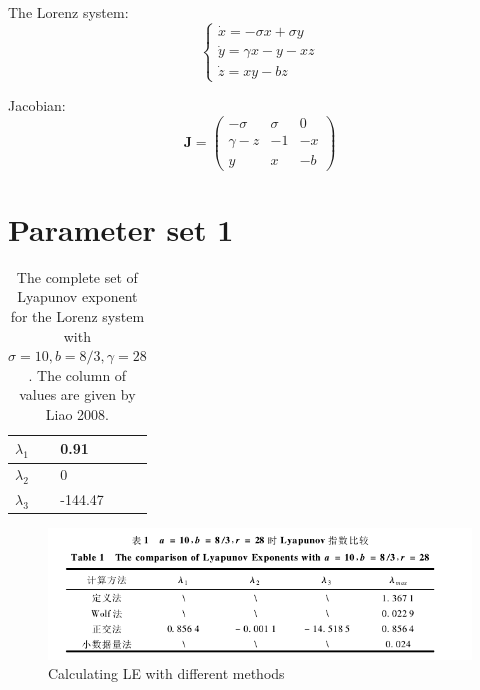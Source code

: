 \documentclass{article}
\begin{document}
	The Lorenz system:
	\begin{displaymath}
		\left\{\begin{array}{l}
		\dot{x} = -\sigma x + \sigma y\\
		\dot{y} = \gamma x - y -xz \\
		\dot{z} = xy - bz
		\end{array}
		\right.
	\end{displaymath}
	
	Jacobian:
	\begin{displaymath}
		\mathbf{J}=
		\left(\begin{array}{ccc}
		-\sigma & \sigma & 0 \\
		\gamma-z & -1 & -x \\
		y & x & -b 
		\end{array}
		\right)
	\end{displaymath}
	
\section{Parameter set 1}	
	\begin{table}[!hbp]
	\caption{The complete set of Lyapunov exponent for the Lorenz system with $\sigma=10,b=8/3,\gamma=28$. The column of values are given by Liao 2008.}
		\begin{tabular}{|l|l|}
		\hline
			$\lambda_1$ & 0.91 \\
		\hline
			$\lambda_2$ & 0 \\
		\hline
			$\lambda_3$ & -144.47\\
		\hline
		\end{tabular} 
	\end{table}
	
	\begin{figure}[!hbp]
	\centering
	\includegraphics[width=1.4\linewidth]{./zhang2012}
	\caption{Calculating LE with different methods}
	\label{fig:zhang2012}
	\end{figure}	
	
\end{document}
